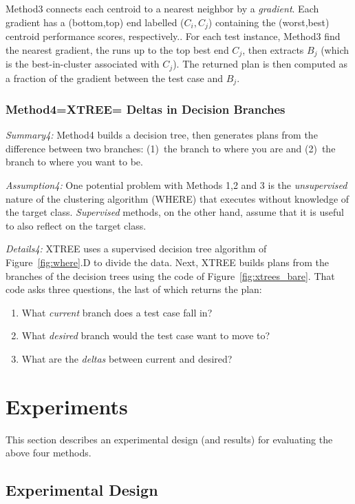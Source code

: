 \documentclass{sig-alternate}
\newcommand{\be}{\begin{enumerate}}
\newcommand{\ee}{\end{enumerate}}
\newcommand{\fig}[1]{Figure~\ref{fig:#1}}
\begin{document}
Method3 connects  each centroid to a nearest neighbor
by a {\em gradient}.
Each gradient has a (bottom,top) end labelled  ($C_i,C_j$) containing the  (worst,best) centroid performance scores, respectively..  
For each test instance, Method3 
find the nearest gradient, the runs up to the top  best end $C_j$, then extracts $B_j$ (which is the
 best-in-cluster associated with  $C_j$).
The returned plan is then computed as a fraction of the gradient between the test case
and $B_j$.
 
%




\subsubsection{Method4=XTREE=  Deltas in Decision   Branches}

{\em Summary4:} Method4 builds a decision tree,  then generates
plans from the difference between two branches:
(1)~the branch to where you are and (2)~the branch to where you want to be.

{\em Assumption4:} One potential problem with Methods 1,2 and 3 is the {\em unsupervised} nature of
the clustering algorithm (WHERE) that  
executes without knowledge of the target class.  {\em Supervised} methods, on the other hand, assume that it is useful to also reflect on the target class.

{\em Details4:} 
XTREE uses a supervised   decision tree algorithm of \fig{where}.D to divide the data.
Next, XTREE builds plans from the branches of the decision trees using the code of \fig{xtrees_bare}.
That code asks three questions, the last of which returns the plan:
\be
\item
What {\em current} branch does a test case fall in?
\item What {\em desired} branch would the test case want to move to?
\item What are the {\em deltas} between current and desired? 
\ee

\section{Experiments}

  
 

This section describes an experimental design (and results) for evaluating the above four methods. 
\subsection{Experimental Design}
\end{document}
